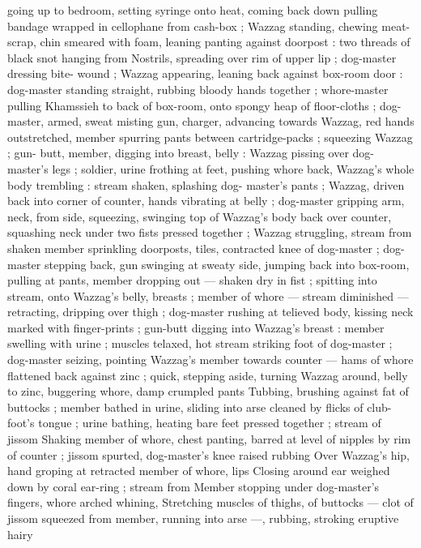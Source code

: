 going up to bedroom, setting syringe onto heat, coming back down 
pulling bandage wrapped in cellophane from cash-box ; Wazzag 
standing, chewing meat-scrap, chin smeared with foam, leaning 
panting against doorpost : two threads of black snot hanging from 
Nostrils, spreading over rim of upper lip ; dog-master dressing bite- 
wound ; Wazzag appearing, leaning back against box-room door : 
dog-master standing straight, rubbing bloody hands together ; 
whore-master pulling Khamssieh to back of box-room, onto spongy 
heap of floor-cloths ; dog-master, armed, sweat misting gun, charger, 
advancing towards Wazzag, red hands outstretched, member 
spurring pants between cartridge-packs ; squeezing Wazzag ; gun- 
butt, member, digging into breast, belly : Wazzag pissing over dog- 
master's legs ; soldier, urine frothing at feet, pushing whore back, 
Wazzag's whole body trembling : stream shaken, splashing dog- 
master's pants ; Wazzag, driven back into corner of counter, hands 
vibrating at belly ; dog-master gripping arm, neck, from side, 
squeezing, swinging top of Wazzag's body back over counter, 
squashing neck under two fists pressed together ; Wazzag 
struggling, stream from shaken member sprinkling doorposts, tiles, 
contracted knee of dog-master ; dog-master stepping back, gun 
swinging at sweaty side, jumping back into box-room, pulling at 
pants, member dropping out --- shaken dry in fist ; spitting into 
stream, onto Wazzag's belly, breasts ; member of whore --- stream 
diminished --- retracting, dripping over thigh ; dog-master rushing at 
telieved body, kissing neck marked with finger-prints ; gun-butt 
digging into Wazzag's breast : member swelling with urine ; muscles 
telaxed, hot stream striking foot of dog-master ; dog-master seizing, 
pointing Wazzag's member towards counter --- hams of whore 
flattened back against zinc ; quick, stepping aside, turning Wazzag 
around, belly to zinc, buggering whore, damp crumpled pants 
Tubbing, brushing against fat of buttocks ; member bathed in urine, 
sliding into arse cleaned by flicks of club-foot's tongue ; urine 
bathing, heating bare feet pressed together ; stream of jissom 
Shaking member of whore, chest panting, barred at level of nipples 
by rim of counter ; jissom spurted, dog-master's knee raised rubbing 
Over Wazzag's hip, hand groping at retracted member of whore, lips 
Closing around ear weighed down by coral ear-ring ; stream from 
Member stopping under dog-master's fingers, whore arched whining, 
Stretching muscles of thighs, of buttocks --- clot of jissom squeezed 
from member, running into arse ---, rubbing, stroking eruptive hairy 
